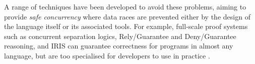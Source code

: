 %
%
%
%
%
A range of techniques have been developed to avoid these problems,
aiming to provide \textit{safe
  concurrency} where data races are prevented either by the design  of the
language itself or its associated tools.
%
For example, full-scale proof systems
such as concurrent separation logics\cite{JacobsEA05,chalice},
Rely/Guarantee\cite{jonesTOPLAS83,MPC-Staden15,concur2007} and
Deny/Guarantee\cite{DenyGuarantee} reasoning, and IRIS\cite{dd}
can guarantee correctness for programs in almost any language,
but are too specialised for developers to use in practice
\cite{fonesca2017,shriramFormal2019}.

